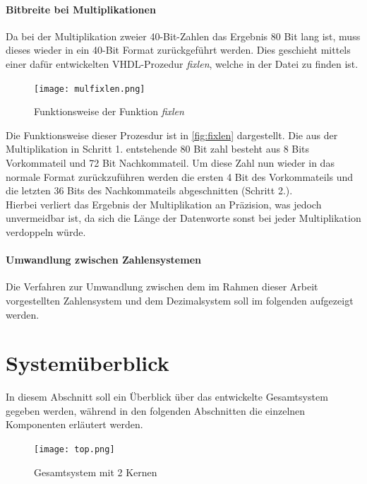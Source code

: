 \documentclass[a4paper,12pt,onesided]{report}
\begin{document}
\paragraph{Bitbreite bei Multiplikationen}
Da bei der Multiplikation zweier 40-Bit-Zahlen das Ergebnis 80 Bit lang ist, muss dieses wieder in ein 40-Bit Format zurückgeführt werden.
Dies geschieht mittels einer dafür entwickelten VHDL-Prozedur \textit{fixlen}, welche in der Datei %
zu finden ist.

\begin{figure}[H]
	\centering
	\texttt{[image: mulfixlen.png]}
	\caption{Funktionsweise der Funktion \textit{fixlen}}
	\label{fig:fixlen}
\end{figure}

Die Funktionsweise dieser Prozesdur ist in \autoref{fig:fixlen} dargestellt.
Die aus der Multiplikation in Schritt 1. entstehende 80 Bit zahl besteht aus 8 Bits Vorkommateil und 72 Bit Nachkommateil.
Um diese Zahl nun wieder in das normale Format zurückzuführen werden die ersten 4 Bit des Vorkommateils und die letzten 36 Bits des Nachkommateils abgeschnitten (Schritt 2.).\\
Hierbei verliert das Ergebnis der Multiplikation an Präzision, was jedoch unvermeidbar ist, da sich die Länge der Datenworte sonst bei jeder Multiplikation verdoppeln würde.

\paragraph{Umwandlung zwischen Zahlensystemen}
Die Verfahren zur Umwandlung zwischen dem im Rahmen dieser Arbeit vorgestellten Zahlensystem und dem Dezimalsystem soll im folgenden aufgezeigt werden.

\section{Systemüberblick}
\label{sec:überblick}
In diesem Abschnitt soll ein Überblick über das entwickelte Gesamtsystem gegeben werden, während in den folgenden Abschnitten die einzelnen Komponenten erläutert werden.

\begin{figure}[H]
	\centering
	\texttt{[image: top.png]}
	\caption{Gesamtsystem mit 2 Kernen}
	\label{fig:top}
\end{figure}
\end{document}
